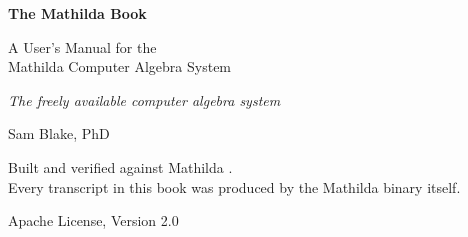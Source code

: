 \begin{titlingpage}
\centering
\vspace*{\fill}

{\Huge\bfseries The Mathilda Book\par}
\vspace{0.6cm}
{\Large A User's Manual for the\\[0.2em] Mathilda Computer Algebra System\par}

\vspace{1.4cm}
{\large\itshape The freely available computer algebra system\par}

\vspace{2.2cm}
{\large Sam Blake, PhD\par}

\vfill

{\small
Built and verified against Mathilda \texttt{\mathildaversion}.\\
Every transcript in this book was produced by the Mathilda binary itself.\par}

\vspace{0.6cm}
{\small Apache License, Version 2.0\par}
\vspace*{\fill}
\end{titlingpage}
